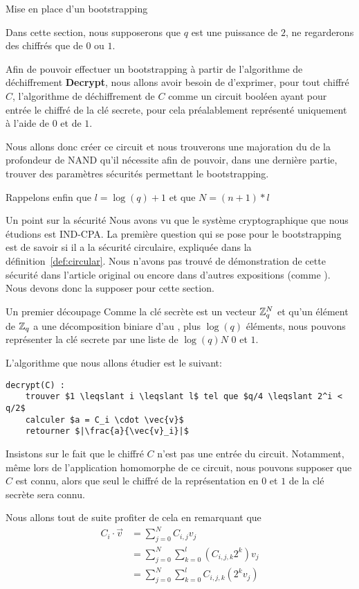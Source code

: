 \begin{section}{Mise en place d'un bootstrapping}

Dans cette section, nous supposerons que $q$ est une puissance de $2$, ne regarderons des chiffrés que de 
$0$ ou $1$. 

Afin de pouvoir effectuer un bootstrapping à partir de l'algorithme de déchiffrement \textbf{Decrypt}, nous
allons avoir besoin de d'exprimer, pour tout chiffré $C$, l'algorithme de déchiffrement de $C$ comme 
un circuit booléen ayant pour entrée le chiffré de la clé secrete, pour cela préalablement représenté
uniquement à l'aide de $0$ et de $1$.

Nous allons donc créer ce circuit et nous trouverons une majoration du de la profondeur de NAND qu'il nécessite
afin de pouvoir, dans une dernière partie, trouver des paramètres sécurités permettant le bootstrapping.

Rappelons enfin que $l = \log(q)+1$ et que $N = (n+1)*l$
\begin{subsection}{Un point sur la sécurité}
Nous avons vu que le système cryptographique que nous étudions est IND-CPA. 
La première question qui se pose pour le bootstrapping est de savoir si il a la sécurité
circulaire, expliquée dans la définition~\ref{def:circular}.  Nous n'avons pas trouvé de démonstration de cette sécurité
dans l'article original \cite{EPRINT:GenSahWat13} ou encore dans d'autres expositions (comme \cite{halevi}). Nous devons
donc la supposer pour cette section.
\end{subsection}
\begin{subsection}{Un premier découpage}
Comme la clé secrète est un vecteur $\mathbb{Z}_q^N$ et qu'un élément de $\mathbb{Z}_q$ a une décomposition biniare d'au ,
plus $\log(q)$ éléments, nous pouvons représenter la clé secrete par une liste de $\log(q)N$
$0$ et $1$.

L'algorithme que nous allons étudier est le suivant:
\begin{lstlisting}[label={lst:decoupage}]
decrypt(C) :
	trouver $1 \leqslant i \leqslant l$ tel que $q/4 \leqslant 2^i < q/2$
	calculer $a = C_i \cdot \vec{v}$
	retourner $|\frac{a}{\vec{v}_i}|$
\end{lstlisting}
Insistons sur le fait que le chiffré $C$ n'est pas une entrée du circuit. Notamment, même lors de 
l'application homomorphe de ce circuit, nous pouvons supposer que $C$ est connu, alors que
seul le chiffré de la représentation en $0$ et $1$ de la clé secrète sera connu. 

Nous allons tout de suite profiter de cela en remarquant que
\begin{align*} 
	C_i \cdot \vec{v} &= \sum_{j=0}^N C_{i,j} v_j \\
	&= \sum_{j=0}^N \sum_{k=0}^l \left( C_{i,j,k} 2^k \right) v_j \\
	&= \sum_{j=0}^N \sum_{k=0}^l C_{i,j,k} (2^k v_j)
\end{align*}


\end{subsection}
\end{section}
